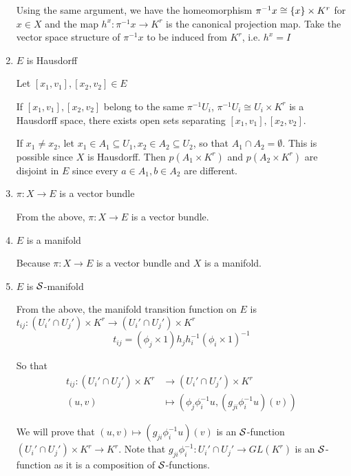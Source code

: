 \begin{remark}
\begin{longproof}
\begin{enumerate}
			Using the same argument, we have the homeomorphism $\pi^{-1} x \cong \{x\} \times K^r$ for $x \in X$ and the map $h^x: \pi^{-1} x \to K^r$ is the canonical projection map. Take the vector space structure of $\pi^{-1}x$ to be induced from $K^r$, i.e. $h^x = I$
			
			\item $E$ is Hausdorff
			
			Let $[x_1, v_1], [x_2, v_2] \in E$
			
			If $[x_1, v_1], [x_2, v_2]$ belong to the same $\pi^{-1} U_i$, $\pi^{-1} U_i \cong U_i \times K^r$ is a Hausdorff space, there exists open sets separating $[x_1, v_1], [x_2, v_2]$. 
			
			If $x_1 \neq x_2$, let $x_1 \in A_1 \subseteq U_1, x_2 \in A_2 \subseteq U_2$,  so that $A_1 \cap A_2 = \emptyset$. This is possible since $X$ is Hausdorff. Then $p(A_1 \times K^r)$ and $p(A_2 \times K^r)$ are disjoint in $E$ since every $a \in A_1, b \in A_2$ are different.
			
			\item $\pi: X \to E$ is a vector bundle
			
			From the above, $\pi: X \to E$ is a vector bundle.
			
			\item $E$ is a manifold
			
			Because $\pi: X \to E$ is a vector bundle and $X$ is a manifold.
			
			\item $E$ is $\mathcal{S}$-manifold
			
			From the above, the manifold transition function on $E$ is $t_{ij}: (U_i' \cap U_j') \times K^r \to (U_i' \cap U_j') \times K^r$
			$$
			t_{ij} = (\phi_j \times 1) h_j h_i^{-1} (\phi_i \times 1)^{-1}
			$$
			
			So that
			\begin{align*}
				t_{ij}: (U_i' \cap U_j') \times K^r &\to (U_i' \cap U_j') \times K^r \\
				(u, v) &\mapsto (\phi_j \phi_i^{-1} u, (g_{ji} \phi_i^{-1} u)(v))
			\end{align*}
			
			We will prove that $(u, v) \mapsto (g_{ji} \phi_i^{-1} u)(v)$ is an $\mathcal{S}$-function $(U_i' \cap U_j') \times K^r \to K^r$. Note that $g_{ji} \phi_i^{-1}: U_i' \cap U_j' \to GL(K^r)$ is an $\mathcal{S}$-function as it is a composition of $\mathcal{S}$-functions.
			

\end{enumerate}
\end{longproof}
\end{remark}
